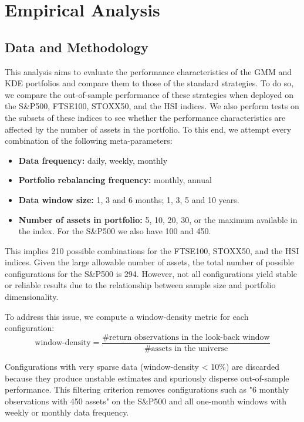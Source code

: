 \chapter{Empirical Analysis}
\label{chap:empirical}

\section{Data and Methodology}
This analysis aims to evaluate the performance characteristics of the GMM and KDE portfolios and compare them to those of the standard strategies. To do so, we compare the out-of-sample performance of these strategies when deployed on the S\&P500, FTSE100, STOXX50, and the HSI indices. We also perform tests on the subsets of these indices to see whether the performance characteristics are affected by the number of assets in the portfolio. To this end, we attempt every combination of the following meta-parameters:
\begin{itemize}
\item \textbf{Data frequency:} daily, weekly, monthly
\item \textbf{Portfolio rebalancing frequency:} monthly, annual
\item \textbf{Data window size:} 1, 3 and 6 months; 1, 3, 5 and 10 years.
\item \textbf{Number of assets in portfolio:} 5, 10, 20, 30, or the maximum available in the index. For the S\&P500 we also have 100 and 450.
\end{itemize}

This implies 210 possible combinations for the FTSE100, STOXX50, and the HSI indices. Given the large allowable number of assets, the total number of possible configurations for the S\&P500 is 294. However, not all configurations yield stable or reliable results due to the relationship between sample size and portfolio dimensionality.

To address this issue, we compute a window-density metric for each configuration:
$$\text{window-density} = \frac{\text{\# return observations in the look-back window}}{\text{\# assets in the universe}}$$

Configurations with very sparse data (window-density < 10\%) are discarded because they produce unstable estimates and spuriously disperse out-of-sample performance. This filtering criterion removes configurations such as "6 monthly observations with 450 assets" on the S\&P500 and all one-month windows with weekly or monthly data frequency.

